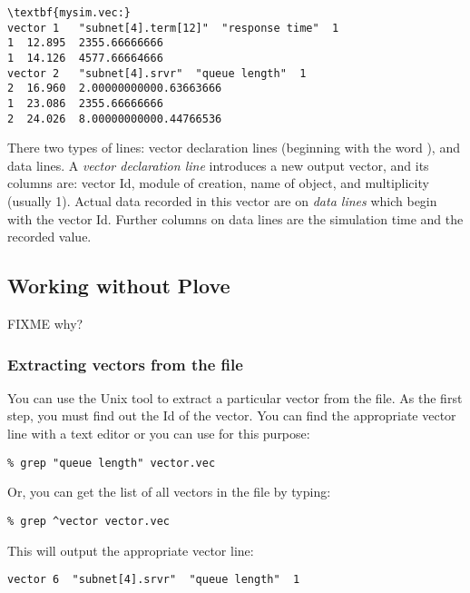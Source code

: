 \begin{Verbatim}[commandchars=\\\{\}]
\textbf{mysim.vec:}
vector 1   "subnet[4].term[12]"  "response time"  1
1  12.895  2355.66666666
1  14.126  4577.66664666
vector 2   "subnet[4].srvr"  "queue length"  1
2  16.960  2.00000000000.63663666
1  23.086  2355.66666666
2  24.026  8.00000000000.44766536
\end{Verbatim}


There two types of lines: vector declaration lines (beginning with
the word ), and data lines.
A \textit{vector declaration line} introduces a new output vector, and
its columns are: vector Id, module of creation, name of 
object, and multiplicity (usually 1). Actual data recorded in this
vector are on \textit{data lines} which begin with the vector Id.
Further columns on data lines are the simulation time and the recorded value.




\subsection{Working without Plove}

FIXME why?

\subsubsection{Extracting vectors from the file}

You can use the Unix  tool to extract a particular vector
from the file. As the first step, you must find out the Id of the
vector. You can find the appropriate vector line with a text editor or
you can use  for this purpose:

\begin{verbatim}
% grep "queue length" vector.vec
\end{verbatim}

Or, you can get the list of all vectors in the file by typing:

\begin{verbatim}
% grep ^vector vector.vec
\end{verbatim}

This will output the appropriate vector line:

\begin{verbatim}
vector 6  "subnet[4].srvr"  "queue length"  1
\end{verbatim}

